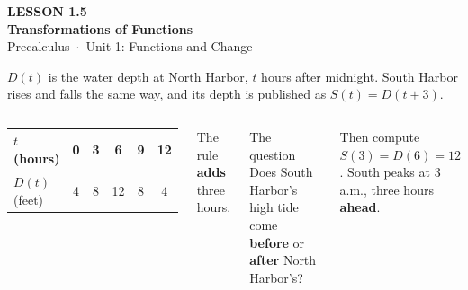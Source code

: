 \documentclass[aspectratio=169, 11pt]{beamer}
\begin{document}
{
\begin{frame}[plain]
  \vspace{2.8cm}\hspace{0.55cm}%
  \begin{minipage}{0.9\textwidth}
    {\color{goldacc}\bfseries\small LESSON 1.5}\\[0.5cm]
    {\color{white}\bfseries\LARGE Transformations of Functions}\\[1.2cm]
    {\color{lilacmid}\small Precalculus~$\cdot$~Unit 1: Functions and Change}
  \end{minipage}
\end{frame}
}

\begin{frame}[t, plain]

  \(D(t)\) is the water depth at North Harbor, \(t\) hours after midnight.
  South Harbor rises and falls the same way, and its depth is published as
  \(S(t) = D(t + 3)\).

  \smallskip
  \begin{columns}[T, onlytextwidth]
      \begin{center}
      \renewcommand{\arraystretch}{1.3}
      \begin{tabular}{|l|c|c|c|c|c|}
      \hline
      \(t\) (hours) & 0 & 3 & 6 & 9 & 12 \\
      \hline
      \(D(t)\) (feet) & 4 & 8 & 12 & 8 & 4 \\
      \hline
      \end{tabular}
      \end{center}

      \medskip
      The rule \textbf{adds} three hours.

      \begin{block}{The question}
        Does South Harbor's high tide come \textbf{before} or \textbf{after}
        North Harbor's?
      \end{block}

      \medskip
      \begin{block}{Then compute}
        \(S(3) = D(6) = 12\). South peaks at 3 a.m., three hours
        \textbf{ahead}.
      \end{block}
  \end{columns}
\end{frame}
\end{document}
